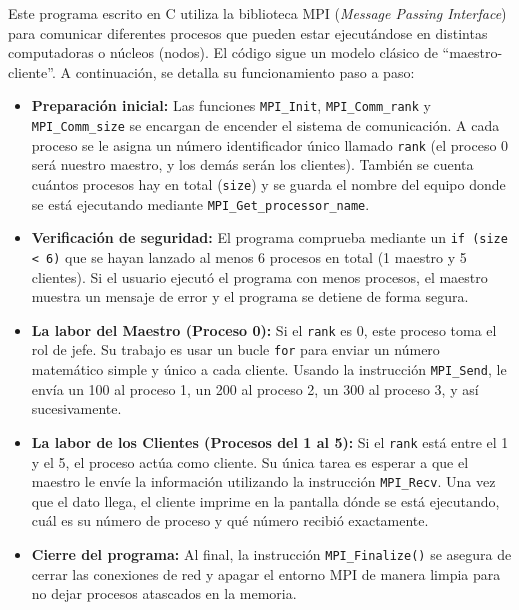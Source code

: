 \documentclass[letterpaper,11pt]{article}
\begin{document}
Este programa escrito en C utiliza la biblioteca MPI (\textit{Message Passing Interface}) para comunicar diferentes procesos que pueden estar ejecutándose en distintas computadoras o núcleos (nodos). El código sigue un modelo clásico de ``maestro-cliente''. A continuación, se detalla su funcionamiento paso a paso:

\begin{itemize}
    \item \textbf{Preparación inicial:} 
    Las funciones \texttt{MPI\_Init}, \texttt{MPI\_Comm\_rank} y \texttt{MPI\_Comm\_size} se encargan de encender el sistema de comunicación. A cada proceso se le asigna un número identificador único llamado \texttt{rank} (el proceso 0 será nuestro maestro, y los demás serán los clientes). También se cuenta cuántos procesos hay en total (\texttt{size}) y se guarda el nombre del equipo donde se está ejecutando mediante \texttt{MPI\_Get\_processor\_name}.

    \item \textbf{Verificación de seguridad:}
    El programa comprueba mediante un \texttt{if (size < 6)} que se hayan lanzado al menos 6 procesos en total (1 maestro y 5 clientes). Si el usuario ejecutó el programa con menos procesos, el maestro muestra un mensaje de error y el programa se detiene de forma segura.

    \item \textbf{La labor del Maestro (Proceso 0):}
    Si el \texttt{rank} es 0, este proceso toma el rol de jefe. Su trabajo es usar un bucle \texttt{for} para enviar un número matemático simple y único a cada cliente. Usando la instrucción \texttt{MPI\_Send}, le envía un 100 al proceso 1, un 200 al proceso 2, un 300 al proceso 3, y así sucesivamente.

    \item \textbf{La labor de los Clientes (Procesos del 1 al 5):}
    Si el \texttt{rank} está entre el 1 y el 5, el proceso actúa como cliente. Su única tarea es esperar a que el maestro le envíe la información utilizando la instrucción \texttt{MPI\_Recv}. Una vez que el dato llega, el cliente imprime en la pantalla dónde se está ejecutando, cuál es su número de proceso y qué número recibió exactamente.

    \item \textbf{Cierre del programa:}
    Al final, la instrucción \texttt{MPI\_Finalize()} se asegura de cerrar las conexiones de red y apagar el entorno MPI de manera limpia para no dejar procesos atascados en la memoria.
\end{itemize}
\end{document}
